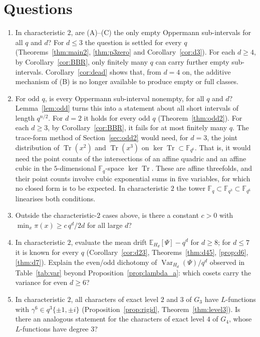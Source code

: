 \documentclass[11pt,a4paper]{amsart}
\theoremstyle{definition}
\theoremstyle{remark}
\newcommand{\F}{\mathbb{F}}
\newcommand{\Tr}{\operatorname{Tr}}
\newcommand{\E}{\mathbb{E}}
\newcommand{\Var}{\operatorname{Var}}
\begin{document}
\section{Questions}
\begin{enumerate}
\item In characteristic $2$, are (A)--(C) the only empty Oppermann sub-intervals for all $q$ and $d$? For $d\le3$ the
question is settled for every $q$ (Theorems~\ref{thm:main2}, \ref{thm:p3zero} and Corollary~\ref{cor:d3}). For each $d\ge4$, by
Corollary~\ref{cor:BBR}, only finitely many $q$ can carry further empty sub-intervals. Corollary~\ref{cor:dead}
shows that, from $d=4$ on, the additive mechanism of (B) is no longer available to produce empty or full classes.
\item For odd $q$, is every Oppermann sub-interval nonempty, for all $q$ and $d$? Lemma~\ref{lem:odd} turns this into
a statement about all short intervals of length $q^{n/2}$. For $d=2$ it holds for every odd $q$
(Theorem~\ref{thm:odd2}). For each $d\ge3$, by Corollary~\ref{cor:BBR}, it fails for at most finitely many $q$. The
trace-form method of Section~\ref{sec:odd2} would need, for $d=3$, the joint distribution of $\Tr(x^2)$ and
$\Tr(x^3)$ on $\ker\Tr\subset\F_{q^6}$. That is, it would need the point counts of the intersections of an
affine quadric and an affine cubic in the $5$-dimensional $\F_q$-space $\ker\Tr$. These are affine threefolds,
and their point counts involve cubic exponential sums in five variables, for which no closed form is to be expected.
In characteristic $2$ the tower $\F_q\subset\F_{q^3}\subset\F_{q^6}$ linearises both conditions.
\item Outside the characteristic-$2$ cases above, is there a constant $c>0$ with $\min_x\pi(x)\ge c\,q^d/2d$ for all
large $d$?
\item In characteristic $2$, evaluate the mean drift $\E_{H_d}[\Psi]-q^d$ for $d\ge8$; for $d\le7$ it is known for
every $q$ (Corollary~\ref{cor:d23}, Theorems~\ref{thm:d45}, \ref{prop:d6}, \ref{thm:d7}). Explain the even/odd dichotomy of $\Var_{H_d}(\Psi)/q^d$ observed in
Table~\ref{tab:var} beyond Proposition~\ref{prop:lambda_a}: which cosets carry the variance for even $d\ge6$?
\item In characteristic $2$, all characters of exact level $2$ and $3$ of $G_3$ have $L$-functions with
$\gamma^6\in q^3\{\pm1,\pm i\}$ (Proposition~\ref{prop:rigid}, Theorem~\ref{thm:level3}). Is there an analogous
statement for the characters of exact level $4$ of $G_4$, whose $L$-functions have degree $3$?
\end{enumerate}
\end{document}
